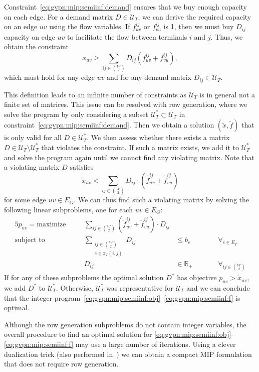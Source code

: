 Constraint~\eqref{eq:gvpn:mip:semiinf:demand} ensures that we buy enough capacity on each edge.
For a demand matrix $D \in \mathcal U_T$, we can derive the required capacity on an edge $uv$ using the flow variables.
If $f^{ij}_{uv}$ or $f^{ij}_{vu}$ is 1, then we must buy $D_{ij}$ capacity on edge $uv$ to facilitate the flow between terminals $i$ and $j$.
Thus, we obtain the constraint
\[
    x_{uv} \ge \sum_{ij \in \binom W 2} D_{ij} ( f^{ij}_{uv} + f^{ij}_{vu}),
\]
which must hold for any edge $uv$ and for any demand matrix $D_{ij} \in \mathcal U_T$.

This definition leads to an infinite number of constraints as $\mathcal U_T$ is in general not a finite set of matrices.
This issue can be resolved with row generation, where we solve the program by only considering a subset $\mathcal U_T^* \subset \mathcal U_T$ in constraint~\eqref{eq:gvpn:mip:semiinf:demand}.
Then we obtain a solution $(\tilde x, \tilde f)$ that is only valid for all $D \in \mathcal U_T^*$.
We then assess whether there exists a matrix $D \in \mathcal U_T \setminus \mathcal U_T^*$ that violates the constraint.
If such a matrix exists, we add it to $\mathcal U_T^*$ and solve the program again until we cannot find any violating matrix.
Note that a violating matrix $D$ satisfies
\[
    \tilde x_{uv} < \sum_{ij \in \binom W 2} D_{ij} \cdot (\tilde f^{ij}_{uv} + \tilde f^{ij}_{vu})
\]
for some edge $uv \in E_G$.
We can thus find such a violating matrix by solving the following linear subproblems, one for each $uv \in E_G$:
\begin{alignat*}{5}
    p_{uv} = \text{maximize}\quad && \sum_{ij \in \binom{W}{2}} (\tilde f_{uv}^{ij} + \tilde f_{vu}^{ij}) \cdot D_{ij} &&& \\
    \text{subject to}\quad && \sum_{\substack{ij \in \binom{W}{2}\\e \in \pi_T(i,j)}} D_{ij} &\le b_e &&\qquad \forall_{e \in E_T} \\
    && D_{ij} &\in \mathbb{R}_+ &&\qquad \forall_{ij \in \binom{W}{2}}
\end{alignat*}
If for any of these subproblems the optimal solution $D^*$ has objective $p_{uv} > \tilde x_{uv}$, we add $D^*$ to $\mathcal U_T^*$.
Otherwise, $\mathcal U_T^*$ was representative for $\mathcal U_T$ and we can conclude that the integer program~\eqref{eq:gvpn:mip:semiinf:obj}--\eqref{eq:gvpn:mip:semiinf:f} is optimal.

Although the row generation subproblems do not contain integer variables, the overall procedure to find an optimal solution for \eqref{eq:gvpn:mip:semiinf:obj}--\eqref{eq:gvpn:mip:semiinf:f} may use a large number of iterations.
Using a clever dualization trick (also performed in~\cite{altin2007provisioning}) we can obtain a compact MIP formulation that does not require row generation.

